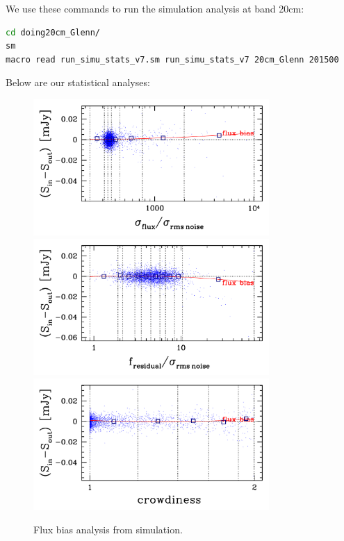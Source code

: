 \documentclass[11pt,a4paper]{article}
\begin{document}
We use these commands to run the simulation analysis at band 20cm:

\begin{lstlisting}[language=bash]
cd doing20cm_Glenn/
sm
macro read run_simu_stats_v7.sm run_simu_stats_v7 20cm_Glenn 201500
\end{lstlisting}

Below are our statistical analyses:

\begin{figure}[H]
	\includegraphics[width=0.8\textwidth]{galsim_20cm_Glenn_fbias_1}
	\includegraphics[width=0.8\textwidth]{galsim_20cm_Glenn_fbias_2}
	\includegraphics[width=0.8\textwidth]{galsim_20cm_Glenn_fbias_3}
	\caption{Flux bias analysis from simulation.}
\end{figure}
\end{document}
